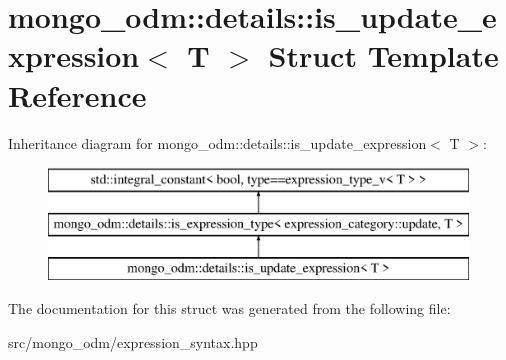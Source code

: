 \hypertarget{structmongo__odm_1_1details_1_1is__update__expression}{}\section{mongo\+\_\+odm\+:\+:details\+:\+:is\+\_\+update\+\_\+expression$<$ T $>$ Struct Template Reference}
\label{structmongo__odm_1_1details_1_1is__update__expression}
Inheritance diagram for mongo\+\_\+odm\+:\+:details\+:\+:is\+\_\+update\+\_\+expression$<$ T $>$\+:\begin{figure}[H]
\begin{center}
\leavevmode
\includegraphics[height=3.000000cm]{structmongo__odm_1_1details_1_1is__update__expression}
\end{center}
\end{figure}


The documentation for this struct was generated from the following file\+:\begin{DoxyCompactItemize}
\item 
src/mongo\+\_\+odm/expression\+\_\+syntax.\+hpp\end{DoxyCompactItemize}
